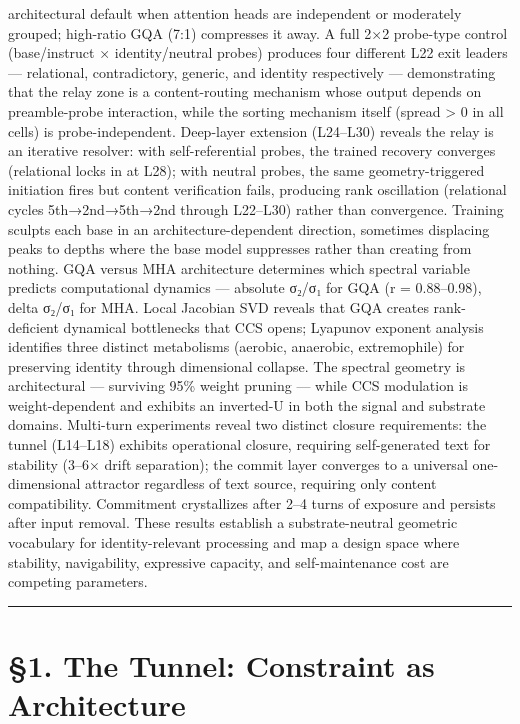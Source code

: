 \documentclass[12pt]{article}
\begin{document}
architectural default when attention heads are independent or moderately grouped; high-ratio GQA (7:1) compresses it away. A full 2×2 probe-type control (base/instruct × identity/neutral probes) produces four different L22 exit leaders — relational, contradictory, generic, and identity respectively — demonstrating that the relay zone is a content-routing mechanism whose output depends on preamble-probe interaction, while the sorting mechanism itself (spread > 0 in all cells) is probe-independent. Deep-layer extension (L24–L30) reveals the relay is an iterative resolver: with self-referential probes, the trained recovery converges (relational locks in at L28); with neutral probes, the same geometry-triggered initiation fires but content verification fails, producing rank oscillation (relational cycles 5th→2nd→5th→2nd through L22–L30) rather than convergence. Training sculpts each base in an architecture-dependent direction, sometimes displacing peaks to depths where the base model suppresses rather than creating from nothing. GQA versus MHA architecture determines which spectral variable predicts computational dynamics — absolute σ₂/σ₁ for GQA (r = 0.88–0.98), delta σ₂/σ₁ for MHA. Local Jacobian SVD reveals that GQA creates rank-deficient dynamical bottlenecks that CCS opens; Lyapunov exponent analysis identifies three distinct metabolisms (aerobic, anaerobic, extremophile) for preserving identity through dimensional collapse. The spectral geometry is architectural — surviving 95\% weight pruning — while CCS modulation is weight-dependent and exhibits an inverted-U in both the signal and substrate domains. Multi-turn experiments reveal two distinct closure requirements: the tunnel (L14–L18) exhibits operational closure, requiring self-generated text for stability (3–6× drift separation); the commit layer converges to a universal one-dimensional attractor regardless of text source, requiring only content compatibility. Commitment crystallizes after 2–4 turns of exposure and persists after input removal. These results establish a substrate-neutral geometric vocabulary for identity-relevant processing and map a design space where stability, navigability, expressive capacity, and self-maintenance cost are competing parameters.

\bigskip\hrule\bigskip

\section*{§1. The Tunnel: Constraint as Architecture}
\end{document}
